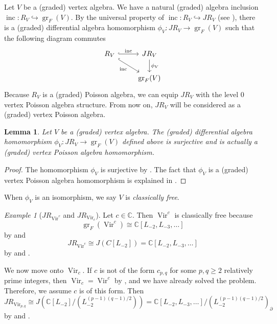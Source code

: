 \documentclass[a4paper, 12pt, reqno]{amsart}
\newtheorem{lemma}[theorem]{Lemma}
\theoremstyle{remark}
\newtheorem{example}[theorem]{Example}
\DeclareMathOperator{\Vir}{Vir}
\DeclareMathOperator{\gr}{gr}
\DeclareMathOperator{\inc}{inc}
\begin{document}
Let $V$ be a (graded) vertex algebra.
We have a natural (graded) algebra inclusion $\inc: R_V \hookrightarrow \gr_F(V)$.
By the universal property of $\inc: R_V \hookrightarrow JR_V$ (see ), there is a (graded) differential algebra homomorphism $\phi_V: JR_V \to \gr_F(V)$ such that the following diagram commutes
\begin{equation*}
  \begin{tikzcd}
    R_V \arrow[rd, "\inc"', hook] \arrow[r, "\inc", hook] & JR_V \arrow[d, "\phi_V"] \\
    & \gr_F(V)
  \end{tikzcd}
\end{equation*}
Because $R_V$ is a (graded) Poisson algebra, we can equip $JR_V$ with the level 0 vertex Poisson algebra structure.
From now on, $JR_V$ will be considered as a (graded) vertex Poisson algebra.

\begin{lemma}
  \label{lmm:7}
  Let $V$ be a (graded) vertex algebra.
  The (graded) differential algebra homomorphism $\phi_V: JR_V \to \gr_F(V)$ defined above is surjective and is actually a (graded) vertex Poisson algebra homomorphism.
\end{lemma}

\begin{proof}
  The homomorphism $\phi_V$ is surjective by .
  The fact that $\phi_V$ is a (graded) vertex Poisson algebra homomorphism is explained in \cite[Proposition 2.5.1]{arakawa_remark_2012}.
\end{proof}

When $\phi_V$ is an isomorphism, we say $V$ is \emph{classically free}.

\begin{example}[$JR_{\Vir^c}$ and $JR_{\Vir_c}$]
  \label{exa:13}
  Let $c \in \mathbb{C}$.
  Then $\Vir^c$ is classically free because
  \begin{equation*}
    \gr_F(\Vir^c) \cong \mathbb{C}[L_{-2}, L_{-3}, \dots]
  \end{equation*}
  by  and
  \begin{equation*}
    JR_{\Vir^c} \cong J(C[L_{-2}]) = \mathbb{C}[L_{-2}, L_{-3}, \dots]
  \end{equation*}
  by  and .

  We now move onto $\Vir_c$.
  If $c$ is not of the form $c_{p, q}$ for some $p, q \ge 2$ relatively prime integers, then $\Vir_c = \Vir^c$ by , and we have already solved the problem.
  Therefore, we assume $c$ is of this form.
  Then
  \begin{equation*}
    JR_{\Vir_{p, q}} \cong J(\mathbb{C}[L_{-2}]/(L_{-2}^{(p - 1)(q - 1)/2})) = \mathbb{C}[L_{-2}, L_{-3}, \dots]/(L_{-2}^{(p - 1)(q - 1)/2})_{\partial}
  \end{equation*}
  by  and .
\end{example}
\end{document}
